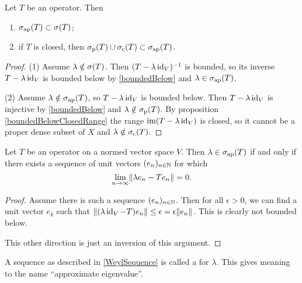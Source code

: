 \begin{proposition} \label{approximateSpectrum}
Let $T$ be an operator. Then
\begin{enumerate}
\item $\sigma_\text{ap}(T) \subset \sigma(T)$;
\item if $T$ is closed, then $\sigma_\text{p}(T)\cup\sigma_\text{c}(T)\subset\sigma_\text{ap}(T)$.
\end{enumerate}
\end{proposition}
\begin{proof}
(1) Assume $\lambda \notin \sigma(T)$. Then $(T-\lambda \operatorname{id}_V)^{-1}$ is bounded, so its inverse $T-\lambda \operatorname{id}_V$ is bounded below by \ref{boundedBelow} and $\lambda\in \sigma_\text{ap}(T)$.

(2) Assume $\lambda\notin \sigma_\text{ap}(T)$, 
so $T-\lambda \operatorname{id}_V$ is bounded below. Then $T-\lambda \operatorname{id}_V$ is injective by \ref{boundedBelow} and $\lambda\notin\sigma_\text{p}(T)$. By proposition \ref{boundedBelowClosedRange} the range $\operatorname{im}(T-\lambda \operatorname{id}_V)$ is closed, so it cannot be a proper dense subset of $X$ and $\lambda\notin\sigma_\text{c}(T)$.
\end{proof}

\begin{proposition} \label{WeylSequence}
Let $T$ be an operator on a normed vector space $V$. Then $\lambda \in \sigma_\text{ap}(T)$ \textup{if and only if} there exists a sequence of unit vectors $(e_n)_{n\in\mathbb{N}}$ for which
\[ \lim_{n\to\infty}\lVert\lambda e_n - Te_n\rVert = 0. \]
\end{proposition}
\begin{proof}
Assume there is such a sequence $(e_n)_{n\in\mathbb{N}}$. Then for all $\epsilon>0$, we can find a unit  vector $e_k$ such that $\lVert(\lambda \operatorname{id}_V - T)e_n\rVert \leq \epsilon = \epsilon \lVert e_n\rVert$. This is clearly not bounded below.

This other direction is just an inversion of this argument.
\end{proof}
A sequence as described in \ref{WeylSequence} is called a  for $\lambda$. This gives meaning to the name ``approximate eigenvalue''.


